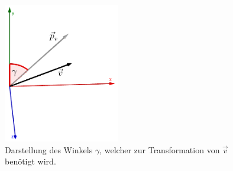 \begin{figure}[h]
  \centering
  \includegraphics[width=0.45\textwidth]{geogebra/img/winkel_v_edited}
  \caption{Darstellung des Winkels \(\gamma\), welcher zur Transformation von \(\vec{v}\) ben\"otigt wird.}
  \label{fig:winkelv}
\end{figure}


